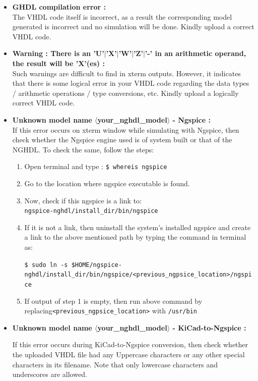 \begin{itemize}
    \item \textbf{GHDL compilation error : }\\
The VHDL code itself is incorrect, as a result the corresponding model generated is incorrect and no simulation will be done. Kindly upload a correct VHDL code. 

\item \textbf{Warning : There is an 'U'$\vert$'X'$\vert$'W'$\vert$'Z'$\vert$'-' in an arithmetic operand, the result will be 'X'(es) : }\\
Such warnings are difficult to find in xterm outputs. However, it indicates that there is some logical error in your VHDL code regarding the data types / arithmetic operations / type conversions, etc. Kindly upload a logically correct VHDL code.

\item \textbf{Unknown model name $\langle$your\_nghdl\_model$\rangle$ - Ngspice : } \\
If this error occurs on xterm window while simulating with Ngspice, then check whether the Ngspice engine used is of system built or that of the NGHDL. To check the same, follow the steps:
\begin{enumerate}
    \item Open terminal and type : \texttt{\$ whereis ngspice}
    \item Go to the location where ngspice executable is found.
    \item Now, check if this ngspice is a link to: \\ \texttt{ngspice-nghdl/install\_dir/bin/ngspice}
    \item If it is not a link, then uninstall the system’s installed ngspice and create a link 
to the above mentioned path by typing the command in terminal as:

\texttt{\$ sudo ln -s \$HOME/ngspice-nghdl/install\_dir/bin/ngspice/<previo\linebreak us\_ngpsice\_location>/ngspice}
\item If output of step 1 is empty, then run above command by replacing\linebreak \texttt{<previous\_ngpsice\_location>} with \texttt{/usr/bin}
\end{enumerate}

\item \textbf{Unknown model name $\langle$your\_nghdl\_model$\rangle$ - KiCad-to-Ngspice : }

If this error occurs during KiCad-to-Ngspice conversion, then check whether the uploaded VHDL file had any Uppercase characters or any other special characters in its filename. Note that only lowercase characters and underscores are allowed.


\end{itemize}
